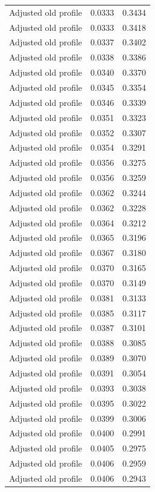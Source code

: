 \begin{table}[htbp]
\begin{tabular}{lll}
Adjusted old profile & 0.0333 & 0.3434 \\
Adjusted old profile & 0.0333 & 0.3418 \\
Adjusted old profile & 0.0337 & 0.3402 \\
Adjusted old profile & 0.0338 & 0.3386 \\
Adjusted old profile & 0.0340 & 0.3370 \\
Adjusted old profile & 0.0345 & 0.3354 \\
Adjusted old profile & 0.0346 & 0.3339 \\
Adjusted old profile & 0.0351 & 0.3323 \\
Adjusted old profile & 0.0352 & 0.3307 \\
Adjusted old profile & 0.0354 & 0.3291 \\
Adjusted old profile & 0.0356 & 0.3275 \\
Adjusted old profile & 0.0356 & 0.3259 \\
Adjusted old profile & 0.0362 & 0.3244 \\
Adjusted old profile & 0.0362 & 0.3228 \\
Adjusted old profile & 0.0364 & 0.3212 \\
Adjusted old profile & 0.0365 & 0.3196 \\
Adjusted old profile & 0.0367 & 0.3180 \\
Adjusted old profile & 0.0370 & 0.3165 \\
Adjusted old profile & 0.0370 & 0.3149 \\
Adjusted old profile & 0.0381 & 0.3133 \\
Adjusted old profile & 0.0385 & 0.3117 \\
Adjusted old profile & 0.0387 & 0.3101 \\
Adjusted old profile & 0.0388 & 0.3085 \\
Adjusted old profile & 0.0389 & 0.3070 \\
Adjusted old profile & 0.0391 & 0.3054 \\
Adjusted old profile & 0.0393 & 0.3038 \\
Adjusted old profile & 0.0395 & 0.3022 \\
Adjusted old profile & 0.0399 & 0.3006 \\
Adjusted old profile & 0.0400 & 0.2991 \\
Adjusted old profile & 0.0405 & 0.2975 \\
Adjusted old profile & 0.0406 & 0.2959 \\
Adjusted old profile & 0.0406 & 0.2943 \\

\end{tabular}
\end{table}

